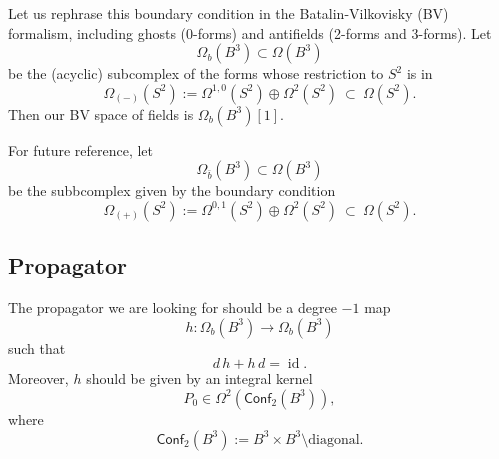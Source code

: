 \documentclass[a4paper]{amsart}
\theoremstyle{plain}
\theoremstyle{definition}
\newcommand{\on}{\operatorname}
\newcommand{\id}{\on{id}}
\newcommand{\cf}{\mathsf{Conf}}
\begin{document}
Let us rephrase this boundary condition in the Batalin-Vilkovisky (BV) formalism, including ghosts (0-forms) and antifields (2-forms and 3-forms). Let 
$$\Omega_b(B^3)\subset\Omega(B^3)$$
be the (acyclic) subcomplex of the forms whose restriction to $S^2$ is in
$$\Omega_{(-)}(S^2):=\Omega^{1,0}(S^2)\oplus\Omega^2(S^2)\ \subset\ \Omega(S^2).$$
Then our BV space of fields is
$\Omega_b(B^3)[1]$.


For future reference, let 
$$\Omega_{\bar b}(B^3)\subset\Omega(B^3)$$
be the subbcomplex given by the boundary condition
$$\Omega_{(+)}(S^2):=\Omega^{0,1}(S^2)\oplus\Omega^2(S^2)\ \subset\ \Omega(S^2).$$


\subsection{Propagator}\label{ssec:Propagator}
The propagator we are looking for should be a degree $-1$ map 
$$h\colon\Omega_b(B^3)\to\Omega_b(B^3)$$
such that
$$d\,h+h\,d=\id.$$
Moreover, $h$ should be given by an integral kernel 
$$P_0\in\Omega^2(\cf_2(B^3)),$$
where
$$\cf_2(B^3):=B^3\times B^3\setminus\text{diagonal}.$$
\end{document}

